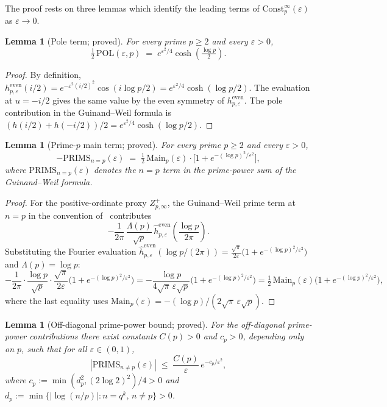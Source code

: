 \documentclass[11pt]{article}
\newtheorem{lemma}[theorem]{Lemma}
\begin{document}
The proof rests on three lemmas which identify the leading terms of
$\mathrm{Const}_p^\infty(\varepsilon)$ as $\varepsilon\to 0$.

\begin{lemma}[Pole term; proved]
\label{lem:pol}
For every prime $p\ge 2$ and every $\varepsilon>0$,
\[
\tfrac12\,\mathrm{POL}(\varepsilon,p)
  \;=\; e^{\varepsilon^2/4}\cosh\!\left(\tfrac{\log p}{2}\right).
\]
\end{lemma}

\begin{proof}
By definition,
$h^{\mathrm{even}}_{p,\varepsilon}(i/2)=e^{-\varepsilon^2(i/2)^2}\cos(i\log p/2)
=e^{\varepsilon^2/4}\cosh(\log p/2)$.
The evaluation at $u=-i/2$ gives the same value by the even symmetry
of $h^{\mathrm{even}}_{p,\varepsilon}$.
The pole contribution in the Guinand--Weil formula is
$(h(i/2)+h(-i/2))/2=e^{\varepsilon^2/4}\cosh(\log p/2)$.
\end{proof}

\begin{lemma}[Prime-$p$ main term; proved]
\label{lem:main}
For every prime $p\ge 2$ and every $\varepsilon>0$,
\[
-\mathrm{PRIMS}_{n=p}(\varepsilon)
  \;=\; \tfrac12\,\mathrm{Main}_p(\varepsilon)\cdot
        \bigl[1 + e^{-(\log p)^2/\varepsilon^2}\bigr],
\]
where $\mathrm{PRIMS}_{n=p}(\varepsilon)$ denotes the $n=p$ term
in the prime-power sum of the Guinand--Weil formula.
\end{lemma}

\begin{proof}
For the positive-ordinate proxy $Z_{p,\infty}^+$, the
Guinand--Weil prime term at $n=p$ in the convention
of~\cite[Ch.\,5]{IwaniecKowalski04} contributes
\[
-\frac{1}{2\pi}\,\frac{\Lambda(p)}{\sqrt p}\,
\hat h^{\mathrm{even}}_{p,\varepsilon}
\!\left(\frac{\log p}{2\pi}\right).
\]
Substituting the Fourier evaluation
$\hat h^{\mathrm{even}}_{p,\varepsilon}(\log p/(2\pi))
=\frac{\sqrt\pi}{2\varepsilon}\bigl(1+e^{-(\log p)^2/\varepsilon^2}\bigr)$
and $\Lambda(p)=\log p$:
\[
-\frac{1}{2\pi}\cdot\frac{\log p}{\sqrt p}\cdot
\frac{\sqrt\pi}{2\varepsilon}
\bigl(1+e^{-(\log p)^2/\varepsilon^2}\bigr)
= -\frac{\log p}{4\sqrt\pi\,\varepsilon\sqrt p}
\bigl(1+e^{-(\log p)^2/\varepsilon^2}\bigr)
= \tfrac12\,\mathrm{Main}_p(\varepsilon)
\bigl(1+e^{-(\log p)^2/\varepsilon^2}\bigr),
\]
where the last equality uses
$\mathrm{Main}_p(\varepsilon)
=-(\log p)/(2\sqrt\pi\,\varepsilon\sqrt p)$.
\end{proof}

\begin{lemma}[Off-diagonal prime-power bound; proved]
\label{lem:subleading}
For the off-diagonal prime-power contributions there exist
constants $C(p)>0$ and $c_p>0$, depending only on $p$,
such that for all $\varepsilon\in(0,1)$,
\[
|\mathrm{PRIMS}_{n\ne p}(\varepsilon)|
  \;\le\; \frac{C(p)}{\varepsilon}\,e^{-c_p/\varepsilon^2},
\]
where $c_p:=\min(d_p^2,(2\log 2)^2)/4>0$ and
$d_p:=\min\{|\log(n/p)|:n=q^k,\,n\ne p\}>0$.
\end{lemma}
\end{document}
